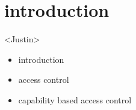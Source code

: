 \section{introduction}
\label{sec:introduction}
<Justin>
\begin{itemize}
\item introduction
\item access control 
\item capability based access control
\end{itemize}
